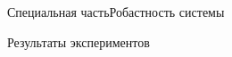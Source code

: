 \begin{frame}{Специальная часть}{Робастность системы}
    \begin{block}{Результаты экспериментов}
    \end{block}
\end{frame}



 

